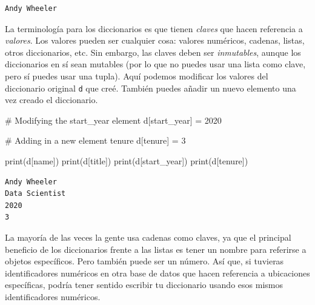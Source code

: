 \documentclass[
  letterpaper,
]{scrbook}
\newenvironment{Shaded}{\begin{snugshade}}{\end{snugshade}}
\newcommand{\BuiltInTok}[1]{\textcolor[rgb]{0.00,0.23,0.31}{#1}}
\newcommand{\CommentTok}[1]{\textcolor[rgb]{0.37,0.37,0.37}{#1}}
\newcommand{\DecValTok}[1]{\textcolor[rgb]{0.68,0.00,0.00}{#1}}
\newcommand{\NormalTok}[1]{\textcolor[rgb]{0.00,0.23,0.31}{#1}}
\newcommand{\OperatorTok}[1]{\textcolor[rgb]{0.37,0.37,0.37}{#1}}
\newcommand{\StringTok}[1]{\textcolor[rgb]{0.13,0.47,0.30}{#1}}
\begin{document}
\begin{verbatim}
Andy Wheeler
\end{verbatim}

La terminología para los diccionarios es que tienen \emph{claves} que
hacen referencia a \emph{valores}. Los valores pueden ser cualquier
cosa: valores numéricos, cadenas, listas, otros diccionarios, etc. Sin
embargo, las claves deben ser \emph{inmutables}, aunque los diccionarios
en sí sean mutables (por lo que no puedes usar una lista como clave,
pero sí puedes usar una tupla). Aquí podemos modificar los valores del
diccionario original \texttt{d} que creé. También puedes añadir un nuevo
elemento una vez creado el diccionario.

\begin{Shaded}
\begin{Highlighting}[]
\CommentTok{\# Modifying the start\_year element}
\NormalTok{d[}\StringTok{\textquotesingle{}start\_year\textquotesingle{}}\NormalTok{] }\OperatorTok{=} \DecValTok{2020}

\CommentTok{\# Adding in a new element tenure}
\NormalTok{d[}\StringTok{\textquotesingle{}tenure\textquotesingle{}}\NormalTok{] }\OperatorTok{=} \DecValTok{3}

\BuiltInTok{print}\NormalTok{(d[}\StringTok{\textquotesingle{}name\textquotesingle{}}\NormalTok{])}
\BuiltInTok{print}\NormalTok{(d[}\StringTok{\textquotesingle{}title\textquotesingle{}}\NormalTok{])}
\BuiltInTok{print}\NormalTok{(d[}\StringTok{\textquotesingle{}start\_year\textquotesingle{}}\NormalTok{])}
\BuiltInTok{print}\NormalTok{(d[}\StringTok{\textquotesingle{}tenure\textquotesingle{}}\NormalTok{])}
\end{Highlighting}
\end{Shaded}

\begin{verbatim}
Andy Wheeler
Data Scientist
2020
3
\end{verbatim}

La mayoría de las veces la gente usa cadenas como claves, ya que el
principal beneficio de los diccionarios frente a las listas es tener un
nombre para referirse a objetos específicos. Pero también puede ser un
número. Así que, si tuvieras identificadores numéricos en otra base de
datos que hacen referencia a ubicaciones específicas, podría tener
sentido escribir tu diccionario usando esos mismos identificadores
numéricos.
\end{document}
